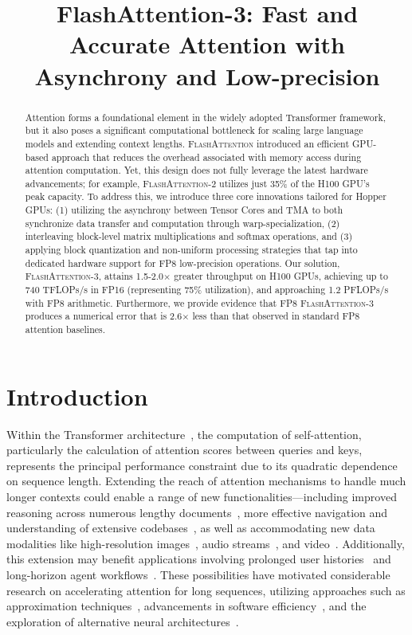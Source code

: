 \title{FlashAttention-3: Fast and Accurate Attention with Asynchrony and Low-precision}

\begin{abstract}
Attention forms a foundational element in the widely adopted Transformer framework, but it also poses a significant computational bottleneck for scaling large language models and extending context lengths. \textsc{FlashAttention} introduced an efficient GPU-based approach that reduces the overhead associated with memory access during attention computation. Yet, this design does not fully leverage the latest hardware advancements; for example, \textsc{FlashAttention-2} utilizes just 35\% of the H100 GPU's peak capacity. To address this, we introduce three core innovations tailored for Hopper GPUs: (1) utilizing the asynchrony between Tensor Cores and TMA to both synchronize data transfer and computation through warp-specialization, (2) interleaving block-level matrix multiplications and softmax operations, and (3) applying block quantization and non-uniform processing strategies that tap into dedicated hardware support for FP8 low-precision operations. Our solution, \textsc{FlashAttention-3}, attains 1.5-2.0$\times$ greater throughput on H100 GPUs, achieving up to 740 TFLOPs/s in FP16 (representing 75\% utilization), and approaching 1.2 PFLOPs/s with FP8 arithmetic. Furthermore, we provide evidence that FP8 \textsc{FlashAttention-3} produces a numerical error that is 2.6$\times$ less than that observed in standard FP8 attention baselines.
\end{abstract}

\section{Introduction}
\label{sec:intro}

Within the Transformer architecture~\citep{vaswani2017attention}, the computation of self-attention, particularly the calculation of attention scores between queries and keys, represents the principal performance constraint due to its quadratic dependence on sequence length. Extending the reach of attention mechanisms to handle much longer contexts could enable a range of new functionalities—including improved reasoning across numerous lengthy documents~\citep{guo2021longt5,shaham2022scrolls,peng2023yarn}, more effective navigation and understanding of extensive codebases~\citep{roziere2023code, li2023starcoder}, as well as accommodating new data modalities like high-resolution images~\citep{chen2022scaling}, audio streams~\citep{gulati2020conformer}, and video~\citep{ho2022video}. Additionally, this extension may benefit applications involving prolonged user histories~\citep{sun2019bert4rec} and long-horizon agent workflows~\citep{yao2022react}. These possibilities have motivated considerable research on accelerating attention for long sequences, utilizing approaches such as approximation techniques~\citep{katharopoulos2020transformers,choromanski2020rethinking,
tay2020efficient}, advancements in software efficiency~\citep{rabe2021self,dao2022flashattention,kwon2023efficient}, and the exploration of alternative neural architectures~\citep{peng2023rwkv,sun2023retentive,gu2023mamba}.

